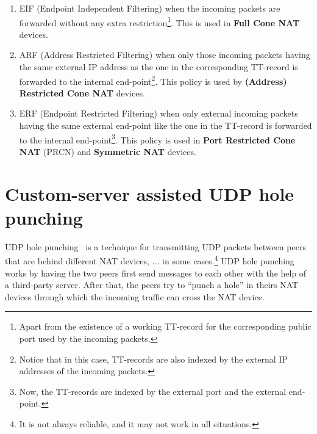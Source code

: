 \begin{enumerate}
\item EIF (Endpoint Independent Filtering) when the incoming packets
  are forwarded without any extra restriction\footnote{Apart from the
    existence of a working TT-record for the corresponding public port
    used by the incoming packets.}. This is used in \textbf{Full Cone
    NAT} devices.
\item ARF (Address Restricted Filtering) when only those incoming
  packets having the same external IP address as the one in the corresponding
  TT-record is forwarded to the internal end-point\footnote{Notice that
    in this case, TT-records are also indexed by the external IP
    addresses of the incoming packets.}. This policy is used by 
  \textbf{(Address) Restricted Cone NAT} devices.
\item ERF (Endpoint Restricted Filtering) when only external incoming
  packets having the same external end-point like the one in the
  TT-record is forwarded to the internal end-point\footnote{Now, the
    TT-records are indexed by the external port and the external
    end-point.}. This policy is used in \textbf{Port Restricted Cone
    NAT} (PRCN) and \textbf{Symmetric NAT} devices.
\end{enumerate}

\section{Custom-server assisted UDP hole punching}

UDP hole punching~\cite{srisuresh2008state} is a technique for
transmitting UDP packets between peers that are behind different NAT
devices, ... in some cases.\footnote{It is not always reliable, and it
  may not work in all situations.} UDP hole punching works by having
the two peers first send messages to each other with the help of a
third-party server. After that, the peers try to ``punch a hole'' in
theirs NAT devices through which the incoming traffic can cross the
NAT device.

